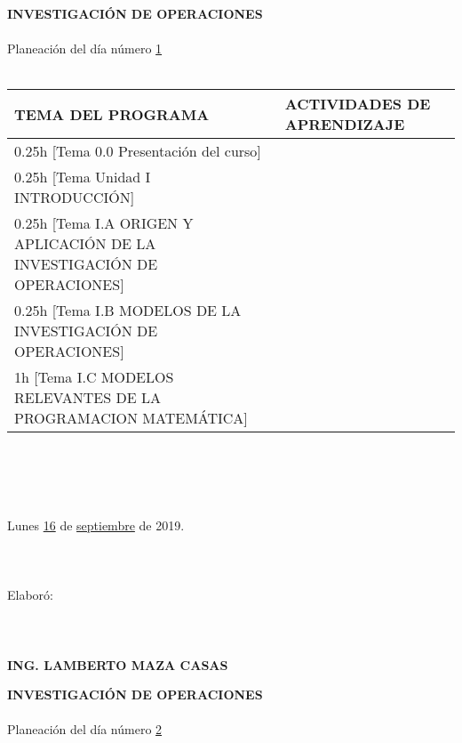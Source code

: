 \documentclass[landscape]{article}
\begin{document}
{\large
\begin{center}
{\bf 
INVESTIGACI\'ON DE OPERACIONES
}
\ \\
\ \\
Planeaci\'on del d\'ia n\'umero \underline{\hspace{0.5cm}1\hspace{0.5cm}}
\ \\
\ \\
\begin{tabular}{|p{11cm}|p{8cm}|}\hline
{\bf TEMA DEL PROGRAMA}&{\bf ACTIVIDADES DE APRENDIZAJE}\\\hline
	0.25h	[Tema 0.0 Presentaci\'on del curso]
&\\
	0.25h	[Tema Unidad I INTRODUCCI\'ON]
&\\
	0.25h	[Tema I.A ORIGEN Y APLICACI\'ON DE LA INVESTIGACI\'ON DE OPERACIONES]
&\\
	0.25h	[Tema I.B MODELOS DE LA INVESTIGACI\'ON DE OPERACIONES]
&\\
	1h	[Tema I.C MODELOS RELEVANTES DE LA PROGRAMACION MATEM\'ATICA]
&\\
\hline
\end{tabular}
\ \\
\ \\
\ \\
\ \\
Lunes \underline{\hspace{0.5cm}16\hspace{0.5cm}} de  \underline{\hspace{0.5cm}septiembre\hspace{0.5cm}} de 2019.
\ \\
\ \\
\ \\
\ \\
Elabor\'o:
\ \\
\ \\
\ \\
\ \\
{\bf ING. LAMBERTO MAZA CASAS}
\end{center}
\eject
\begin{center}
{\bf 
INVESTIGACI\'ON DE OPERACIONES
}
\ \\
\ \\
Planeaci\'on del d\'ia n\'umero \underline{\hspace{0.5cm}2\hspace{0.5cm}}
\ \\
\ \\
\begin{tabular}{|p{11cm}|p{8cm}|}\hline

\end{tabular}
\end{center}}
\end{document}
